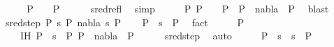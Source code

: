 \begin{isabellebody}
\ \ \isamarkupfalse%
\ \isamarkupfalse%
\ {\isachardoublequoteopen}P{}\ {\isasymturnstile}\ {\isacharbrackleft}{\kern0pt}{\isacharbrackright}{\kern0pt}\ {\isasymleadsto}\isactrlsup {\isacharasterisk}{\kern0pt}\ P{}{\isachardoublequoteclose}\isanewline
\ \ \ \ \isamarkupfalse%
\ sred{\isacharunderscore}{\kern0pt}refl\ \isamarkupfalse%
\ simp\isanewline
\ \ \isamarkupfalse%
\ \isamarkupfalse%
\ {\isachardoublequoteopen}{\isasymexists}P{}{\isachardot}{\kern0pt}\ P{}\ {\isasymturnstile}\ {\isacharbrackleft}{\kern0pt}{\isacharbrackright}{\kern0pt}\ {\isasymleadsto}\isactrlsup {\isacharasterisk}{\kern0pt}\ P{}\ {\isasymand}\ P{}\ {\isasymturnstile}\ nabla{}\ {\isasymrightarrow}\isactrlsup {\isacharasterisk}{\kern0pt}\ P{}{\isachardoublequoteclose}\ \isamarkupfalse%
\ blast\isanewline
{}\isamarkupfalse%
\isanewline
\ \ \isamarkupfalse%
\ {\isacharparenleft}{\kern0pt}sred{\isacharunderscore}{\kern0pt}step\ P{}\ s{}\ P{\isacharprime}{\kern0pt}\ nabla{}\ s{}\ P{}{\isacharparenright}{\kern0pt}\isanewline
\ \ \isamarkupfalse%
\ {\isachardoublequoteopen}P{}\ {\isasymturnstile}\ s{}\ {\isasymleadsto}\ P{\isacharprime}{\kern0pt}{\isachardoublequoteclose}\ \isamarkupfalse%
\ fact\isanewline
\ \ \isamarkupfalse%
\ \isamarkupfalse%
\ P{}\ \isanewline
\ \ \ \ IH{\isacharcolon}{\kern0pt}\ {\isachardoublequoteopen}P{\isacharprime}{\kern0pt}\ {\isasymturnstile}\ s{}\ {\isasymleadsto}\isactrlsup {\isacharasterisk}{\kern0pt}\ P{}{\isachardoublequoteclose}\ {\isachardoublequoteopen}P{}\ {\isasymturnstile}\ nabla{}\ {\isasymrightarrow}\isactrlsup {\isacharasterisk}{\kern0pt}\ P{}{\isachardoublequoteclose}\isanewline
\ \ \ \ \isamarkupfalse%
\ sred{\isacharunderscore}{\kern0pt}step{\isacharparenleft}{\kern0pt}{}{\isacharparenright}{\kern0pt}\ \isamarkupfalse%
\ auto\isanewline
\ \ \isamarkupfalse%
\ \isamarkupfalse%
\ {\isachardoublequoteopen}P{}\ {\isasymturnstile}\ s{}\ {\isasymbullet}\ s{}\ {\isasymleadsto}\isactrlsup {\isacharasterisk}{\kern0pt}\ P{}{\isachardoublequoteclose}\ \isanewline

\end{isabellebody}
